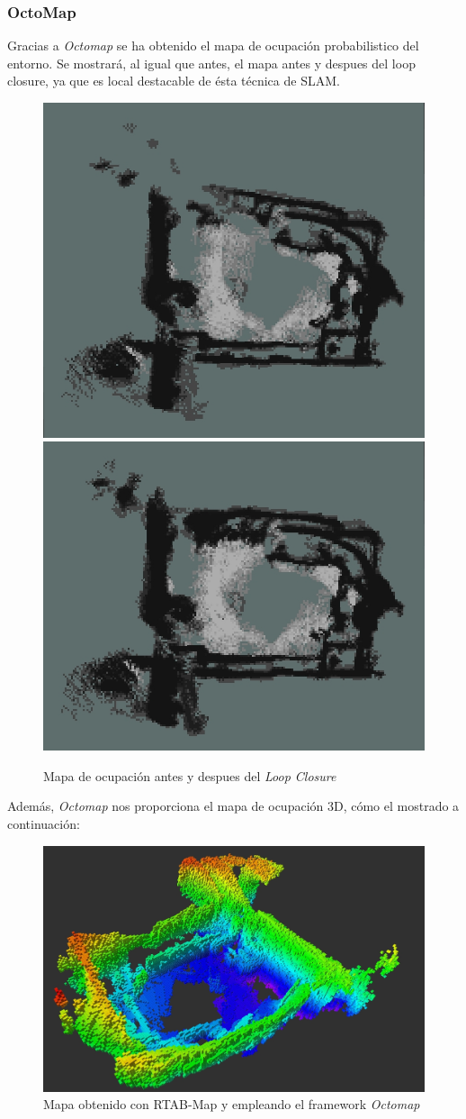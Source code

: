 \subsubsection{OctoMap}
Gracias a \textit{Octomap} se ha obtenido el mapa de ocupación probabilistico del entorno. Se mostrará, al igual que antes, el mapa antes y despues del loop closure, ya que es local
destacable de ésta técnica de SLAM.
\begin{figure}[h!]
    \centering
    \includegraphics[width=.4\textwidth]{images/slam/bag1_occupGrid_noLC}
    \includegraphics[width=.435\textwidth]{images/slam/bag1_occupGrid_LC}
    \caption{Mapa de ocupación antes y despues del \textit{Loop Closure}}
\end{figure}

Además, \textit{Octomap} nos proporciona el mapa de ocupación 3D, cómo el mostrado a continuación:
\begin{figure}[h!]
    \centering
    \includegraphics[width=.9\textwidth]{images/slam/bag1_octomap_LC}
    \caption{Mapa obtenido con RTAB-Map y empleando el framework \textit{Octomap}}
\end{figure}

